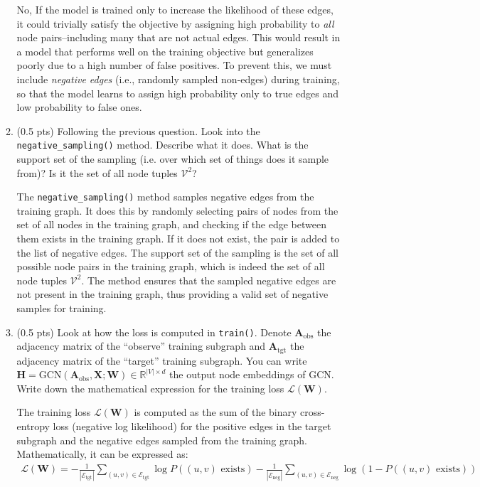 \begin{enumerate}
\begin{enumerate}
        No, If the model is trained only to increase the likelihood of these
        edges, it could trivially satisfy the objective by assigning high
        probability to \emph{all} node pairs--including many that are not
        actual edges. This would result in a model that performs well on the
        training objective but generalizes poorly due to a high number of false
        positives. To prevent this, we must include \emph{negative edges} (i.e.,
        randomly sampled non-edges) during training, so that the model learns to
        assign high probability only to true edges and low probability to false
        ones.
        
        \item (0.5 pts) Following the previous question. Look into the
        \texttt{negative\_sampling()} method. Describe what it does. What is the
        support set of the sampling (i.e. over which set of things does it
        sample from)? Is it the set of all node tuples $\mathcal{V}^2$? 

        The \texttt{negative\_sampling()} method samples negative edges from the
        training graph. It does this by randomly selecting pairs of nodes from
        the set of all nodes in the training graph, and checking if the edge
        between them exists in the training graph. If it does not exist, the
        pair is added to the list of negative edges. The support set of the
        sampling is the set of all possible node pairs in the training graph,
        which is indeed the set of all node tuples $\mathcal{V}^2$. The method
        ensures that the sampled negative edges are not present in the training
        graph, thus providing a valid set of negative samples for training.

        \item (0.5 pts) Look at how the loss is computed in \texttt{train()}.
        Denote $\mathbf{A}_{\text{obs}}$ the adjacency matrix of the ``observe''
        training subgraph and $\mathbf{A}_{\text{tgt}}$ the adjacency matrix of
        the ``target'' training subgraph. You can write $\mathbf{H} =
        \text{GCN}(\mathbf{A}_{\text{obs}}, \mathbf{X}; \mathbf{W}) \in
        \mathbb{R}^{|V| \times d}$ the output node embeddings of GCN. Write down
        the mathematical expression for the training loss
        $\mathcal{L}(\mathbf{W})$.

        The training loss $\mathcal{L}(\mathbf{W})$ is computed as the sum of the
        binary cross-entropy loss (negative log likelihood) for the positive edges in the target subgraph
        and the negative edges sampled from the training graph. Mathematically, it
        can be expressed as:
        \begin{align*}
            \mathcal{L}(\mathbf{W}) = -\frac{1}{|\mathcal{E}_{\text{tgt}}|} \sum_{(u, v) \in \mathcal{E}_{\text{tgt}}} \log P((u, v) \text{~exists}) - \frac{1}{|\mathcal{E}_{\text{neg}}|} \sum_{(u, v) \in \mathcal{E}_{\text{neg}}} \log (1 - P((u, v) \text{~exists}))
        \end{align*}


\end{enumerate}
\end{enumerate}
